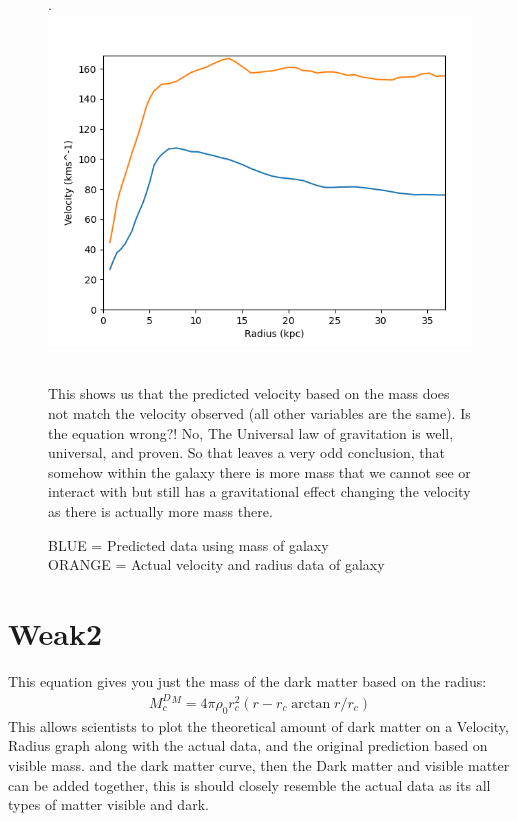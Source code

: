 \documentclass[10pt, twocolumn, twoside]{article}
\begin{document}
\begin{figure}[ht] .
\includegraphics[width=\columnwidth]{capture.png}
\caption[width=\columnwidth]{BLUE = Predicted data using mass of galaxy \\
ORANGE = Actual velocity and radius data of galaxy} \\
This shows us that the predicted velocity based on the mass does not match the velocity observed (all other variables are the same). Is the equation wrong?! No, The Universal law of gravitation is well, universal, and proven. So that leaves a very odd conclusion, that somehow within the galaxy there is more mass that we cannot see or interact with but still has a gravitational effect changing the velocity as there is actually more mass there.
\end{figure}




\section{Weak2}
This equation gives you just the mass of the dark matter based on the radius:
\begin{equation*}
\label{GaussE}
\begin{aligned}
M_c^D^M= 4\pi\rho_0r_c^2(r-r_c \arctan{r/r_c})
\end{aligned}
\end{equation*}
This allows scientists to plot the theoretical amount of dark matter on a Velocity, Radius graph along with the actual data, and the original prediction based on visible mass. and the dark matter curve, then the Dark matter and visible matter can be added together, this is should closely resemble the actual data as its all types of matter visible and dark.
\pagebreak
\end{document}
